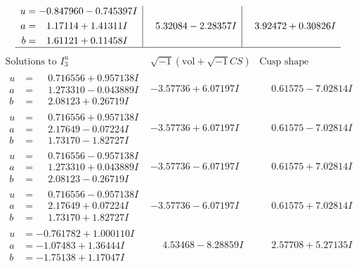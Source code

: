 \documentclass[1p]{elsarticle_modified}
\theoremstyle{definition}
\newcommand{\I}{\sqrt{-1}}
\begin{document}
$$\begin{array}{c|c|c}
\begin{aligned}
u &= -0.847960 - 0.745397 I \\
a &= \phantom{-}1.17114 + 1.41311 I \\
b &= \phantom{-}1.61121 + 0.11458 I\end{aligned}
 & \phantom{-}5.32084 - 2.28357 I & \phantom{-}3.92472 + 0.30826 I\\
 \hline 
 \end{array}$$\newpage$$\begin{array}{c|c|c}  
\text{Solutions to }I^u_{3}& \I (\text{vol} + \sqrt{-1}CS) & \text{Cusp shape}\\
 \hline 
\begin{aligned}
u &= \phantom{-}0.716556 + 0.957138 I \\
a &= \phantom{-}1.273310 - 0.043889 I \\
b &= \phantom{-}2.08123 + 0.26719 I\end{aligned}
 & -3.57736 + 6.07197 I & \phantom{-}0.61575 - 7.02814 I \\ \hline\begin{aligned}
u &= \phantom{-}0.716556 + 0.957138 I \\
a &= \phantom{-}2.17649 - 0.07224 I \\
b &= \phantom{-}1.73170 - 1.82727 I\end{aligned}
 & -3.57736 + 6.07197 I & \phantom{-}0.61575 - 7.02814 I \\ \hline\begin{aligned}
u &= \phantom{-}0.716556 - 0.957138 I \\
a &= \phantom{-}1.273310 + 0.043889 I \\
b &= \phantom{-}2.08123 - 0.26719 I\end{aligned}
 & -3.57736 - 6.07197 I & \phantom{-}0.61575 + 7.02814 I \\ \hline\begin{aligned}
u &= \phantom{-}0.716556 - 0.957138 I \\
a &= \phantom{-}2.17649 + 0.07224 I \\
b &= \phantom{-}1.73170 + 1.82727 I\end{aligned}
 & -3.57736 - 6.07197 I & \phantom{-}0.61575 + 7.02814 I \\ \hline\begin{aligned}
u &= -0.761782 + 1.000110 I \\
a &= -1.07483 + 1.36444 I \\
b &= -1.75138 + 1.17047 I\end{aligned}
 & \phantom{-}4.53468 - 8.28859 I & \phantom{-}2.57708 + 5.27135 I \\ \hline\begin{aligned}

\end{aligned}
\end{array}$$
\end{document}
